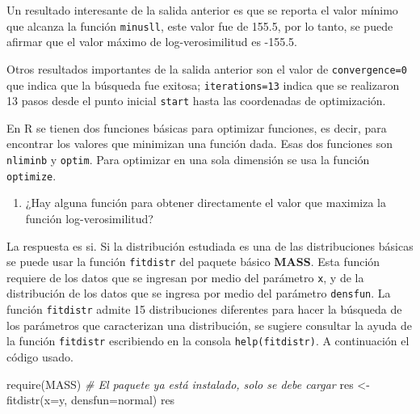 \documentclass[
]{book}
\makeatletter
\newenvironment{Shaded}{\begin{snugshade}}{\end{snugshade}}
\newcommand{\AttributeTok}[1]{\textcolor[rgb]{0.77,0.63,0.00}{#1}}
\newcommand{\CommentTok}[1]{\textcolor[rgb]{0.56,0.35,0.01}{\textit{#1}}}
\newcommand{\FunctionTok}[1]{\textcolor[rgb]{0.00,0.00,0.00}{#1}}
\newcommand{\NormalTok}[1]{#1}
\newcommand{\OtherTok}[1]{\textcolor[rgb]{0.56,0.35,0.01}{#1}}
\newcommand{\StringTok}[1]{\textcolor[rgb]{0.31,0.60,0.02}{#1}}
\providecommand{\tightlist}{%
  \setlength{\itemsep}{0pt}\setlength{\parskip}{0pt}}
\newenvironment{kframe}{%
\medskip{}
\setlength{\fboxsep}{.8em}
 \def\at@end@of@kframe{}%
 \ifinner\ifhmode%
  \def\at@end@of@kframe{\end{minipage}}%
  \begin{minipage}{\columnwidth}%
 \fi\fi%
 \def\FrameCommand##1{\hskip\@totalleftmargin \hskip-\fboxsep
 \colorbox{shadecolor}{##1}\hskip-\fboxsep
     \hskip-\linewidth \hskip-\@totalleftmargin \hskip\columnwidth}%
 \MakeFramed {\advance\hsize-\width
   \@totalleftmargin\z@ \linewidth\hsize
   \@setminipage}}%
 {\par\unskip\endMakeFramed%
 \at@end@of@kframe}
\renewenvironment{Shaded}{\begin{kframe}}{\end{kframe}}
\newenvironment{rmdblock}[1]
  {
  \begin{itemize}
  \renewcommand{\labelitemi}{
    \raisebox{-.7\height}[0pt][0pt]{
      {\setkeys{Gin}{width=3em,keepaspectratio}\texttt{[image: images/\#1]}}
    }
  }
  \setlength{\fboxsep}{1em}
  \begin{kframe}
  \item
  }
  {
  \end{kframe}
  \end{itemize}
  }
\newenvironment{rmdnote}
  {\begin{rmdblock}{note}}
  {\end{rmdblock}}
\makeatother
\begin{document}
Un resultado interesante de la salida anterior es que se reporta el valor mínimo que alcanza la función \texttt{minusll}, este valor fue de 155.5, por lo tanto, se puede afirmar que el valor máximo de log-verosimilitud es -155.5.

Otros resultados importantes de la salida anterior son el valor de \texttt{convergence=0} que indica que la búsqueda fue exitosa; \texttt{iterations=13} indica que se realizaron 13 pasos desde el punto inicial \texttt{start} hasta las coordenadas de optimización.

\begin{rmdnote}
En R se tienen dos funciones básicas para optimizar funciones, es decir, para encontrar los valores que minimizan una función dada. Esas dos funciones son \texttt{nliminb} y \texttt{optim}. Para optimizar en una sola dimensión se usa la función \texttt{optimize}.
\end{rmdnote}

\begin{enumerate}
\def\labelenumi{\arabic{enumi})}
\setcounter{enumi}{3}
\tightlist
\item
  ¿Hay alguna función para obtener directamente el valor que maximiza la función log-verosimilitud?
\end{enumerate}

La respuesta es si. Si la distribución estudiada es una de las distribuciones básicas se puede usar la función \texttt{fitdistr} del paquete básico \textbf{MASS}. Esta función requiere de los datos que se ingresan por medio del parámetro \texttt{x}, y de la distribución de los datos que se ingresa por medio del parámetro \texttt{densfun}. La función \texttt{fitdistr} admite 15 distribuciones diferentes para hacer la búsqueda de los parámetros que caracterizan una distribución, se sugiere consultar la ayuda de la función \texttt{fitdistr} escribiendo en la consola \texttt{help(fitdistr)}. A continuación el código usado. 

\begin{Shaded}
\begin{Highlighting}[]
\FunctionTok{require}\NormalTok{(MASS) }\CommentTok{\# El paquete ya está instalado, solo se debe cargar}
\NormalTok{res }\OtherTok{\textless{}{-}} \FunctionTok{fitdistr}\NormalTok{(}\AttributeTok{x=}\NormalTok{y, }\AttributeTok{densfun=}\StringTok{\textquotesingle{}normal\textquotesingle{}}\NormalTok{)}
\NormalTok{res}
\end{Highlighting}
\end{Shaded}
\end{document}
